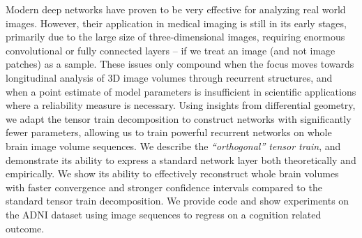 Modern deep networks have proven to be very effective for analyzing real world images.
However, their application in medical imaging is still in its early stages,
primarily due to the large size of three-dimensional images, requiring enormous convolutional or fully connected layers --
if we treat an image (and not image patches) as a sample. 
These issues only compound when the focus moves towards longitudinal analysis of 3D image volumes 
through recurrent structures, and when a point estimate of model parameters is insufficient 
in scientific applications where a reliability measure is necessary.
Using insights from differential geometry, we adapt the tensor train decomposition to construct networks
with significantly fewer parameters,
allowing us to train powerful recurrent networks on whole brain image volume sequences. 
We describe the \textit{``orthogonal'' tensor train},
and demonstrate its ability to express a standard network layer both theoretically and empirically.
We show its ability to 
effectively reconstruct whole brain volumes
with faster convergence and stronger confidence intervals
compared to the standard tensor train decomposition. We provide code and show experiments on the ADNI dataset
using image sequences to regress on a cognition related outcome.
